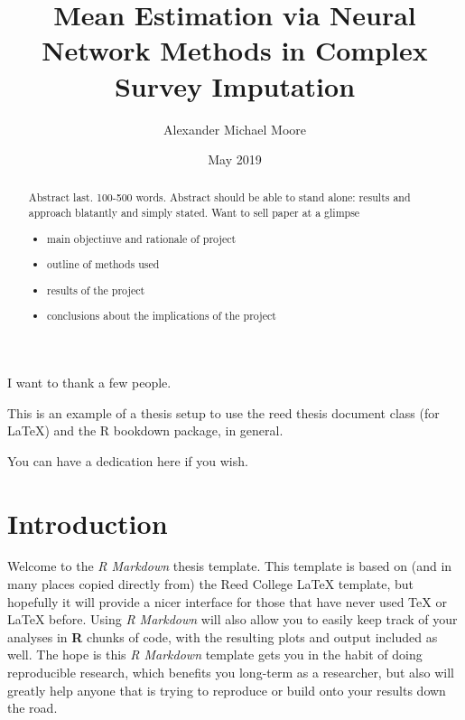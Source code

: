 \documentclass[12pt,twoside]{reedthesis}
\title{Mean Estimation via Neural Network Methods in Complex Survey Imputation}
\author{Alexander Michael Moore}
\date{May 2019}
\providecommand{\tightlist}{%
  \setlength{\itemsep}{0pt}\setlength{\parskip}{0pt}}
\begin{document}
  \maketitle

\frontmatter %
\pagestyle{empty} %
  \begin{acknowledgements}
    I want to thank a few people.
  \end{acknowledgements}
  \begin{preface}
    This is an example of a thesis setup to use the reed thesis document
    class (for LaTeX) and the R bookdown package, in general.
  \end{preface}
  \hypersetup{linkcolor=black}
  \setcounter{tocdepth}{2}
  \tableofcontents

  \listoftables

  \listoffigures
  \begin{abstract}
    Abstract last. 100-500 words. Abstract should be able to stand alone:
    results and approach blatantly and simply stated. Want to sell paper at
    a glimpse
    \begin{itemize}
    \tightlist
    \item
      main objectiuve and rationale of project
    \item
      outline of methods used
    \item
      results of the project
    \item
      conclusions about the implications of the project
    \end{itemize}
  \end{abstract}
  \begin{dedication}
    You can have a dedication here if you wish.
  \end{dedication}
\mainmatter %
\pagestyle{fancyplain} %

\chapter*{Introduction}\label{introduction}

Welcome to the \emph{R Markdown} thesis template. This template is based
on (and in many places copied directly from) the Reed College LaTeX
template, but hopefully it will provide a nicer interface for those that
have never used TeX or LaTeX before. Using \emph{R Markdown} will also
allow you to easily keep track of your analyses in \textbf{R} chunks of
code, with the resulting plots and output included as well. The hope is
this \emph{R Markdown} template gets you in the habit of doing
reproducible research, which benefits you long-term as a researcher, but
also will greatly help anyone that is trying to reproduce or build onto
your results down the road.
\end{document}
